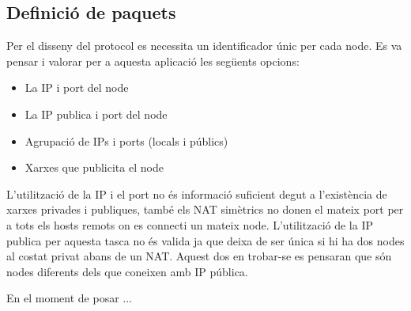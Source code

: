 \subsection{Definició de paquets}
Per el disseny del protocol es necessita un identificador únic per cada node. Es va pensar i valorar per a aquesta aplicació les següents opcions:
\begin{itemize}
\item La IP i port del node
\item La IP publica i port del node
\item Agrupació de IPs i ports (locals i públics)
\item Xarxes que publicita el node
\end{itemize}
L'utilització de la IP i el port no és informació suficient degut a l'existència de xarxes privades i publiques, també els NAT simètrics no donen el mateix port per a tots els hosts remots on es connecti un mateix node.
L'utilització de la IP publica per aquesta tasca no és valida ja que deixa de ser única si hi ha dos nodes al costat privat abans de un NAT. Aquest dos en trobar-se es pensaran que són nodes diferents dels que coneixen amb IP pública.

En el moment de posar ...

